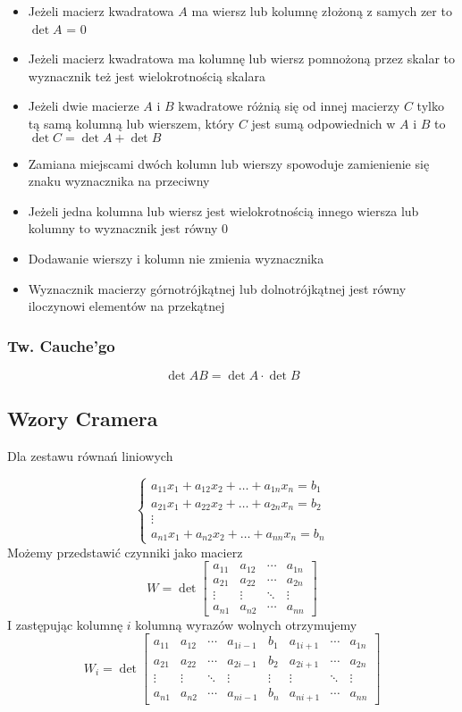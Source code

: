 \documentclass{../notatki}
\begin{document}
\begin{itemize}
    \item Jeżeli macierz kwadratowa $A$ ma wiersz lub kolumnę złożoną z samych zer to $\det A$ = 0
    \item Jeżeli macierz kwadratowa ma kolumnę lub wiersz pomnożoną przez skalar to wyznacznik też jest wielokrotnością skalara
    \item Jeżeli dwie macierze $A$ i $B$ kwadratowe różnią się od innej macierzy $C$ tylko tą samą kolumną lub wierszem, który $C$ jest sumą odpowiednich w $A$ i $B$ to $\det C = \det A + \det B$
    \item Zamiana miejscami dwóch kolumn lub wierszy spowoduje zamienienie się znaku wyznacznika na przeciwny
    \item Jeżeli jedna kolumna lub wiersz jest wielokrotnością innego wiersza lub kolumny to wyznacznik jest równy 0
    \item Dodawanie wierszy i kolumn nie zmienia wyznacznika
    \item Wyznacznik macierzy górnotrójkątnej lub dolnotrójkątnej jest równy iloczynowi elementów na przekątnej
\end{itemize}

\subsubsection{Tw. Cauche'go}

$$
\det AB = \det A \cdot \det B
$$

\subsection{Wzory Cramera}

Dla zestawu równań liniowych

$$
\begin{cases}
    a_{11}x_1 + a_{12}x_2 + \dots + a_{1n}x_n = b_1 \\
    a_{21}x_1 + a_{22}x_2 + \dots + a_{2n}x_n = b_2 \\
    \vdots \\
    a_{n1}x_1 + a_{n2}x_2 + \dots + a_{nn}x_n = b_n
\end{cases}
$$
Możemy przedstawić czynniki jako macierz
$$
W = \det
\begin{bmatrix}
    a_{11} & a_{12} & \cdots & a_{1n} \\
    a_{21} & a_{22} & \cdots & a_{2n} \\
    \vdots & \vdots & \ddots & \vdots \\
    a_{n1} & a_{n2} & \cdots & a_{nn}
\end{bmatrix}
$$
I zastępując kolumnę $i$ kolumną wyrazów wolnych otrzymujemy
$$
W_i = \det
\begin{bmatrix}
    a_{11} & a_{12} & \cdots & a_{1i-1} & b_1 & a_{1i+1} & \cdots & a_{1n} \\
    a_{21} & a_{22} & \cdots & a_{2i-1} & b_2 & a_{2i+1} & \cdots & a_{2n} \\
    \vdots & \vdots & \ddots & \vdots & \vdots & \vdots & \ddots & \vdots \\
    a_{n1} & a_{n2} & \cdots & a_{ni-1} & b_n & a_{ni+1} & \cdots & a_{nn}
\end{bmatrix}
$$
\end{document}
